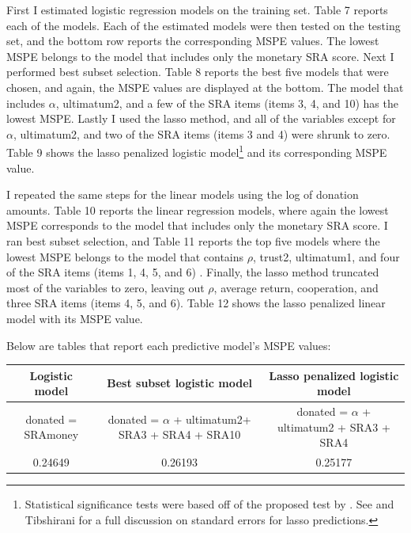 \documentclass[12pt]{article}
\begin{document}
First I estimated logistic regression models on the training set. Table 7 reports each of the models. Each of the estimated models were then tested on the testing set, and the bottom row reports the corresponding MSPE values. The lowest MSPE belongs to the model that includes only the monetary SRA score. Next I performed best subset selection. Table 8 reports the best five models that were chosen, and again, the MSPE values are displayed at the bottom. The model that includes \(\alpha\), ultimatum2, and a few of the SRA items (items 3, 4, and 10) has the lowest MSPE. Lastly I used the lasso method, and all of the variables except for \(\alpha\), ultimatum2, and two of the SRA items (items 3 and 4) were shrunk to zero. Table 9 shows the lasso penalized logistic model\footnote{Statistical significance tests were based off of the proposed test by \cite{lockhart_2014}. See \cite{kyung_2010} and Tibshirani for a full discussion on standard errors for lasso predictions.} and its corresponding MSPE value.

I repeated the same steps for the linear models using the log of donation amounts. Table 10 reports the linear regression models, where again the lowest MSPE corresponds to the model that includes only the monetary SRA score. I ran best subset selection, and Table 11 reports the top five models where the lowest MSPE belongs to the model that contains \(\rho\), trust2, ultimatum1, and four of the SRA items (items 1, 4, 5, and 6) . Finally, the lasso method truncated most of the variables to zero, leaving out \(\rho\), average return, cooperation, and  three SRA items (items 4, 5, and 6). Table 12 shows the lasso penalized linear model with its MSPE value.

Below are tables that report each predictive model\rq s MSPE values:


\begin{center}
\begin{adjustbox}{width=\textwidth}
\begin{tabular}{ c | c | c }
\hline \hline
Logistic model & Best subset logistic model & Lasso penalized logistic model \\ 
\hline
\small donated = SRAmoney & donated = \(\alpha\) + ultimatum2+ SRA3 + SRA4 + SRA10 & donated = \(\alpha\) + ultimatum2 + SRA3 + SRA4 \\
 \hline
 0.24649 & 0.26193 & 0.25177 \\  
 \hline \hline
\end{tabular}
\end{adjustbox}
\end{center}
 
\end{document}
